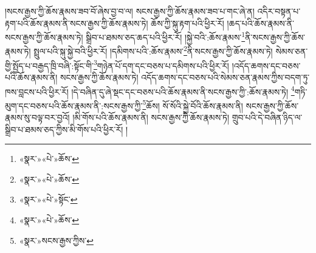 །སངས་རྒྱས་ཀྱི་ཆོས་རྣམས་ཟབ་བོ་ཞེས་བྱ་བ་ལ། སངས་རྒྱས་ཀྱི་ཆོས་རྣམས་ཟབ་པ་གང་ཞེ་ན། འདིར་བསྟན་པ་རྟག་པའི་ཆོས་རྣམས་ནི་སངས་རྒྱས་ཀྱི་ཆོས་རྣམས་ཏེ། ཆོས་ཀྱི་སྐུ་རྟག་པའི་ཕྱིར་རོ། །ཆད་པའི་ཆོས་རྣམས་ནི་སངས་རྒྱས་ཀྱི་ཆོས་རྣམས་ཏེ། སྒྲིབ་པ་ཐམས་ཅད་ཆད་པའི་ཕྱིར་རོ། །སྐྱེ་བའི་:ཆོས་རྣམས་\footnote{«སྣར་»«པེ་»ཆོས་}ནི་སངས་རྒྱས་ཀྱི་ཆོས་རྣམས་ཏེ། སྤྲུལ་པའི་སྐུ་སྐྱེ་བའི་ཕྱིར་རོ། །དམིགས་པའི་:ཆོས་རྣམས་\footnote{«སྣར་»«པེ་»ཆོས་}ནི་སངས་རྒྱས་ཀྱི་ཆོས་རྣམས་ཏེ། སེམས་ཅན་གྱི་སྤྱོད་པ་བརྒྱད་ཁྲི་བཞི་:སྟོང་གི་\footnote{«སྣར་»«པེ་»སྟོང་}གཉེན་པོ་དག་དང་བཅས་པ་དམིགས་པའི་ཕྱིར་རོ། །འདོད་ཆགས་དང་བཅས་པའི་ཆོས་རྣམས་ནི། སངས་རྒྱས་ཀྱི་ཆོས་རྣམས་ཏེ། འདོད་ཆགས་དང་བཅས་པའི་སེམས་ཅན་རྣམས་ཀྱིས་བདག་ཏུ་ཁས་བླངས་པའི་ཕྱིར་རོ། །དེ་བཞིན་དུ་ཞེ་སྡང་དང་བཅས་པའི་ཆོས་རྣམས་ནི་སངས་རྒྱས་ཀྱི་:ཆོས་རྣམས་ཏེ། \footnote{«སྣར་»«པེ་»ཆོས་}གཏི་མུག་དང་བཅས་པའི་ཆོས་རྣམས་ནི་:སངས་རྒྱས་ཀྱི་\footnote{«སྣར་»སངས་རྒྱས་ཀྱིས་}ཆོས། སོ་སོའི་སྐྱེ་བོའི་ཆོས་རྣམས་ནི། སངས་རྒྱས་ཀྱི་ཆོས་རྣམས་སུ་བལྟ་བར་བྱའོ། །མི་གོས་པའི་ཆོས་རྣམས་ནི། སངས་རྒྱས་ཀྱི་ཆོས་རྣམས་ཏེ། གྲུབ་པའི་དེ་བཞིན་ཉིད་ལ་སྒྲིབ་པ་ཐམས་ཅད་ཀྱིས་མི་གོས་པའི་ཕྱིར་རོ། །
